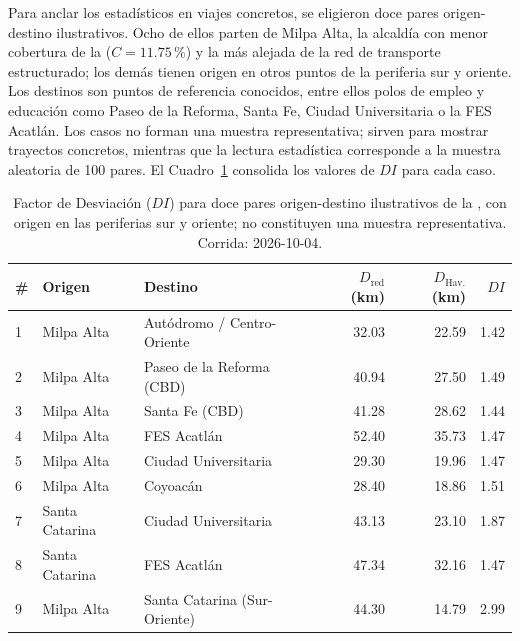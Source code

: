 Para anclar los estadísticos en viajes concretos, se eligieron doce pares
origen-destino ilustrativos. Ocho de ellos parten de Milpa Alta, la alcaldía con
menor cobertura de la \cdmx{} ($C = 11.75$\,\%) y la más alejada de la red de
transporte estructurado; los demás tienen origen en otros puntos de la periferia
sur y oriente. Los destinos son puntos de referencia conocidos, entre ellos
polos de empleo y educación como Paseo de la Reforma, Santa Fe, Ciudad
Universitaria o la FES Acatlán. Los casos no forman una muestra representativa;
sirven para mostrar trayectos concretos, mientras que la lectura estadística
corresponde a la muestra aleatoria de 100 pares. El Cuadro~\ref{tab:di-casos}
consolida los valores de $DI$ para cada caso.

\begin{table}[H]
    \centering
    \caption[Factor de Desviación — doce casos de estudio]{%
    Factor de Desviación ($DI$) para doce pares origen-destino
    ilustrativos de la \zmvm{}, con origen en las periferias sur y
    oriente; no constituyen una muestra representativa. Corrida: 2026-10-04.}
    \label{tab:di-casos}
    \small
    \begin{tabularx}{\textwidth}{|l|X|X|r|r|r|}
        \hline
        \textbf{\#} & \textbf{Origen} & \textbf{Destino} &
        \textbf{$D_{\text{red}}$ (km)} &
        \textbf{$D_{\text{Hav.}}$ (km)} &
        \textbf{$DI$} \\
        \hline
         1 & Milpa Alta        & Autódromo / Centro-Oriente   & 32.03 & 22.59 & 1.42 \\
         2 & Milpa Alta        & Paseo de la Reforma (CBD)    & 40.94 & 27.50 & 1.49 \\
         3 & Milpa Alta        & Santa Fe (CBD)               & 41.28 & 28.62 & 1.44 \\
         4 & Milpa Alta        & FES Acatlán                  & 52.40 & 35.73 & 1.47 \\
         5 & Milpa Alta        & Ciudad Universitaria         & 29.30 & 19.96 & 1.47 \\
         6 & Milpa Alta        & Coyoacán                     & 28.40 & 18.86 & 1.51 \\
         7 & Santa Catarina    & Ciudad Universitaria         & 43.13 & 23.10 & 1.87 \\
         8 & Santa Catarina    & FES Acatlán                  & 47.34 & 32.16 & 1.47 \\
         9 & Milpa Alta        & Santa Catarina (Sur-Oriente) & 44.30 & 14.79 & 2.99 \\

\end{tabularx}
\end{table}
